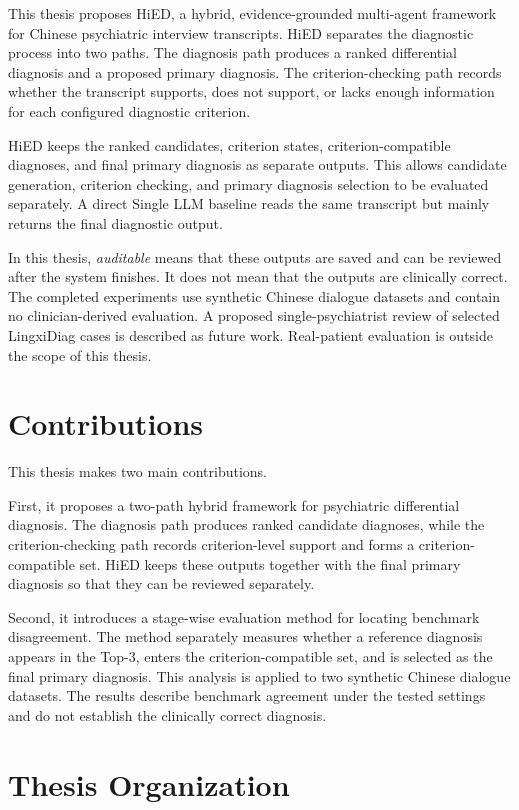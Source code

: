\documentclass[12pt,a4paper,oneside]{report}
\begin{document}
This thesis proposes HiED, a hybrid, evidence-grounded multi-agent framework for Chinese psychiatric interview transcripts. HiED separates the diagnostic process into two paths. The diagnosis path produces a ranked differential diagnosis and a proposed primary diagnosis. The criterion-checking path records whether the transcript supports, does not support, or lacks enough information for each configured diagnostic criterion.

HiED keeps the ranked candidates, criterion states, criterion-compatible diagnoses, and final primary diagnosis as separate outputs. This allows candidate generation, criterion checking, and primary diagnosis selection to be evaluated separately. A direct Single LLM baseline reads the same transcript but mainly returns the final diagnostic output.

In this thesis, \emph{auditable} means that these outputs are saved and can be reviewed after the system finishes. It does not mean that the outputs are clinically correct. The completed experiments use synthetic Chinese dialogue datasets and contain no clinician-derived evaluation. A proposed single-psychiatrist review of selected LingxiDiag cases is described as future work. Real-patient evaluation is outside the scope of this thesis.

\section{Contributions}

This thesis makes two main contributions.

First, it proposes a two-path hybrid framework for psychiatric differential diagnosis. The diagnosis path produces ranked candidate diagnoses, while the criterion-checking path records criterion-level support and forms a criterion-compatible set. HiED keeps these outputs together with the final primary diagnosis so that they can be reviewed separately.

Second, it introduces a stage-wise evaluation method for locating benchmark disagreement. The method separately measures whether a reference diagnosis appears in the Top-3, enters the criterion-compatible set, and is selected as the final primary diagnosis. This analysis is applied to two synthetic Chinese dialogue datasets. The results describe benchmark agreement under the tested settings and do not establish the clinically correct diagnosis.

\section{Thesis Organization}
\end{document}
